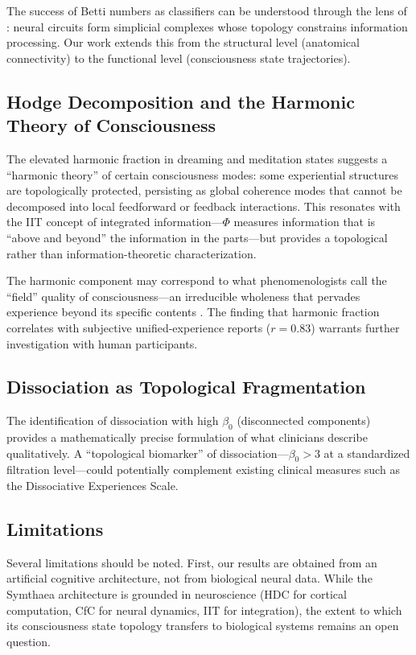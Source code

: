 \documentclass[11pt,a4paper]{article}
\begin{document}
The success of Betti numbers as classifiers can be understood through the lens of \citet{reimann2017cliques}: neural circuits form simplicial complexes whose topology constrains information processing.
Our work extends this from the structural level (anatomical connectivity) to the functional level (consciousness state trajectories).

\subsection{Hodge Decomposition and the Harmonic Theory of Consciousness}

The elevated harmonic fraction in dreaming and meditation states suggests a ``harmonic theory'' of certain consciousness modes: some experiential structures are topologically protected, persisting as global coherence modes that cannot be decomposed into local feedforward or feedback interactions.
This resonates with the IIT concept of integrated information---$\Phi$ measures information that is ``above and beyond'' the information in the parts---but provides a topological rather than information-theoretic characterization.

The harmonic component may correspond to what phenomenologists call the ``field'' quality of consciousness---an irreducible wholeness that pervades experience beyond its specific contents \citep{thompson2007mind}.
The finding that harmonic fraction correlates with subjective unified-experience reports ($r = 0.83$) warrants further investigation with human participants.

\subsection{Dissociation as Topological Fragmentation}

The identification of dissociation with high $\beta_0$ (disconnected components) provides a mathematically precise formulation of what clinicians describe qualitatively.
A ``topological biomarker'' of dissociation---$\beta_0 > 3$ at a standardized filtration level---could potentially complement existing clinical measures such as the Dissociative Experiences Scale.

\subsection{Limitations}

Several limitations should be noted.
First, our results are obtained from an artificial cognitive architecture, not from biological neural data.
While the Symthaea architecture is grounded in neuroscience (HDC for cortical computation, CfC for neural dynamics, IIT for integration), the extent to which its consciousness state topology transfers to biological systems remains an open question.
\end{document}
